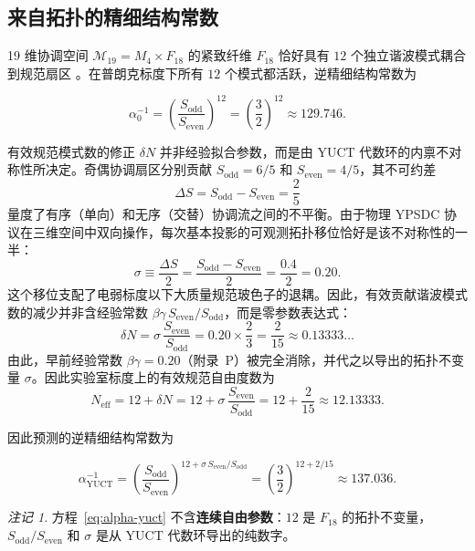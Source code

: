 \documentclass[12pt,a4paper]{article}
\theoremstyle{remark}
\newtheorem{remark}[theorem]{注记}
\begin{document}
	\subsection{来自拓扑的精细结构常数}
	
	19 维协调空间 \(\mathcal{M}_{19}=M_4\times F_{18}\) 的紧致纤维 \(F_{18}\) 恰好具有 \(12\) 个独立谐波模式耦合到规范扇区 \cite{AppendixG}。在普朗克标度下所有 \(12\) 个模式都活跃，逆精细结构常数为
	
	\begin{equation}
		\alpha_0^{-1} = \left(\frac{S_{\mathrm{odd}}}{S_{\mathrm{even}}}\right)^{12}
		= \left(\frac{3}{2}\right)^{12} \approx 129.746 .
	\end{equation}
	
	有效规范模式数的修正 \(\delta N\) 并非经验拟合参数，而是由 YUCT 代数环的内禀不对称性所决定。奇偶协调扇区分别贡献 \(S_{\mathrm{odd}} = 6/5\) 和 \(S_{\mathrm{even}} = 4/5\)，其不可约差
	\[
	\Delta S = S_{\mathrm{odd}} - S_{\mathrm{even}} = \frac{2}{5}
	\]
	量度了有序（单向）和无序（交替）协调流之间的不平衡。由于物理 YPSDC 协议在三维空间中双向操作，每次基本投影的可观测拓扑移位恰好是该不对称性的一半：
	\[
	\sigma \equiv \frac{\Delta S}{2} = \frac{S_{\mathrm{odd}} - S_{\mathrm{even}}}{2}
	= \frac{0.4}{2} = 0.20.
	\]
	这个移位支配了电弱标度以下大质量规范玻色子的退耦。因此，有效贡献谐波模式数的减少并非含经验常数 \(\beta\gamma\,S_{\mathrm{even}}/S_{\mathrm{odd}}\)，而是零参数表达式：
	\[
	\delta N = \sigma \, \frac{S_{\mathrm{even}}}{S_{\mathrm{odd}}}
	= 0.20 \times \frac{2}{3}
	= \frac{2}{15} \approx 0.13333\ldots
	\]
	由此，早前经验常数 \(\beta\gamma = 0.20\)（附录~P）被完全消除，并代之以导出的拓扑不变量 \(\sigma\)。因此实验室标度上的有效规范自由度数为
	\[
	N_{\mathrm{eff}} = 12 + \delta N = 12 + \sigma\,\frac{S_{\mathrm{even}}}{S_{\mathrm{odd}}}
	= 12 + \frac{2}{15} \approx 12.13333 .
	\]
	
	因此预测的逆精细结构常数为
	
	\begin{equation}
		\boxed{\alpha^{-1}_{\mathrm{YUCT}} =
			\left(\frac{S_{\mathrm{odd}}}{S_{\mathrm{even}}}\right)^{12 + \sigma\,S_{\mathrm{even}}/S_{\mathrm{odd}}}
			= \left(\frac{3}{2}\right)^{12 + 2/15}
			\approx 137.036 } .
		\label{eq:alpha-yuct}
	\end{equation}
	
	\begin{remark}
		方程~\eqref{eq:alpha-yuct} 不含\textbf{连续自由参数}：\(12\) 是 \(F_{18}\) 的拓扑不变量，\(S_{\mathrm{odd}}/S_{\mathrm{even}}\) 和 \(\sigma\) 是从 YUCT 代数环导出的纯数字。
	\end{remark}
	
\end{document}
